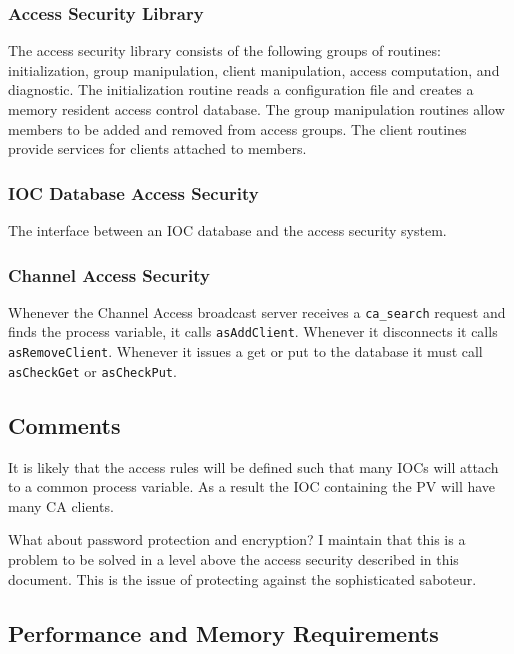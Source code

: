 \subsubsection{Access Security Library}

The access security library consists of the following groups of routines: initialization, group manipulation, client 
manipulation, access computation, and diagnostic. The initialization routine reads a configuration file and creates a 
memory resident access control database. The group manipulation routines allow members to be added and removed from 
access groups. The client routines provide services for clients attached to members.

\subsubsection{IOC Database Access Security}

The interface between an IOC database and the access security system.

\subsubsection{Channel Access Security}

Whenever the Channel Access broadcast server receives a \verb|ca_search| request and finds the process variable, it calls 
\verb|asAddClient|.  Whenever it disconnects it calls \verb|asRemoveClient|. Whenever it issues a get or put to the database it 
must call \verb|asCheckGet| or \verb|asCheckPut|.

\subsection{Comments}

It is likely that the access rules will be defined such that many IOCs will attach to a common process variable. As a result 
the IOC containing the PV will have many CA clients.

What about password protection and encryption? I maintain that this is a problem to be solved in a level above the access 
security described in this document. This is the issue of protecting against the sophisticated saboteur.

\subsection{Performance and Memory Requirements}


